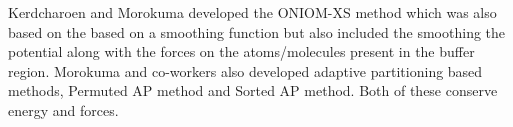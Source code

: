 Kerdcharoen and Morokuma developed the ONIOM-XS method which was also based
on the based on a smoothing function but also included the smoothing the potential
along with the forces on the atoms/molecules present in the buffer region.
Morokuma and co-workers also developed adaptive partitioning based methods, Permuted AP
method and Sorted AP method. Both of these conserve energy and forces.

\newpage

